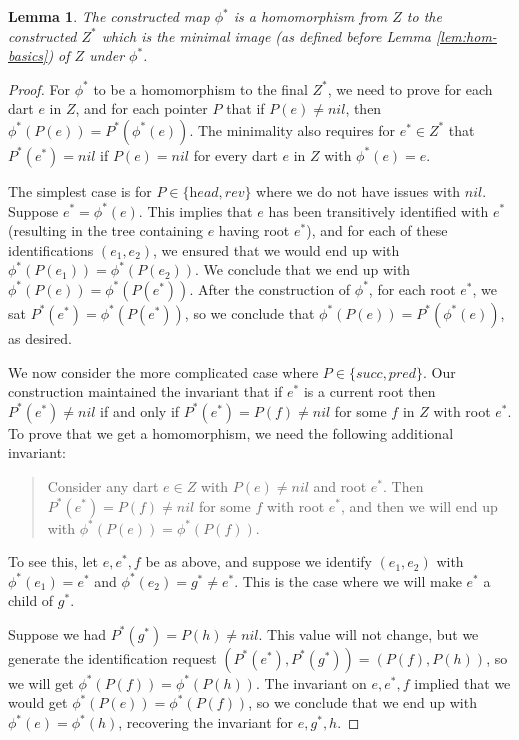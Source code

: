\documentclass[10pt,a4paper]{article}
\newtheorem{lem}[thm]{Lemma}
\def\nil{\textit{nil}}
\def\head{\textit{head}}
\def\reverse{\textit{rev}}
\def\successor{\textit{succ}}
\def\predecessor{\textit{pred}}
\begin{document}
\begin{lem}\label{lem:Z*}
The constructed map $\phi^*$ is a homomorphism from $Z$ to the constructed $Z^*$
which is the minimal image 
(as defined before Lemma  \ref{lem:hom-basics})
of $Z$ under $\phi^*$.
\end{lem}

\begin{proof}
    For $\phi^*$ to be a homomorphism to
    the final $Z^*$, we need to prove for each dart $e$ in $Z$, and for each
    pointer $P$ that if $P(e)\neq\nil$, then $\phi^*(P(e))=P^*(\phi^*(e))$. The minimality also requires for  $e^*\in Z^*$ that $P^*(e^*)=\nil$ if 
    $P(e)=\nil$ for every dart $e$ in $Z$ with $\phi^*(e)=e$.

    The simplest case is for $P\in\{\head,\reverse\}$ where we do not have issues with $\nil$. Suppose $e^*=\phi^*(e)$.
    This implies that $e$ has been transitively identified with $e^*$ (resulting in the tree containing $e$ having root $e^*$), and for each of these identifications $(e_1,e_2)$, we ensured that
    we would end up with $\phi^*(P(e_1))=\phi^*(P(e_2))$. We conclude that we end up with $\phi^*(P(e))=\phi^*(P(e^*))$. After the construction of $\phi^*$, 
    for each root $e^*$, we sat 
    $P^*(e^*)=\phi^*(P(e^*))$, so we
    conclude that 
    $\phi^*(P(e))=P^*(\phi^*(e))$, as desired.

    We now consider the more complicated case where 
    $P\in\{\successor,\predecessor\}$. 
    Our construction maintained the invariant that     if $e^*$ is a current root then $P^*(e^*)\neq\nil$ if and only if $P^*(e^*)=P(f)\neq\nil$
    for some $f$ in $Z$
    with root $e^*$. To prove that we get a homomorphism, we need the following additional invariant:
    \begin{quote}
        Consider any dart $e\in Z$ with $P(e)\neq \nil$ and root $e^*$.
       Then $P^*(e^*)=P(f)\neq\nil$ for
    some $f$ with root $e^*$, and then we will end up with $\phi^*(P(e))=\phi^*(P(f))$.
    \end{quote}
    To see this, let $e,e^*,f$ be as above, and suppose we  identify $(e_1,e_2)$ with $\phi^*(e_1)=e^*$ and $\phi^*(e_2)=g^*\neq e^*$. 
    This is the case where we will make $e^*$ a child of $g^*$.

    Suppose we had $P^*(g^*)=P(h)\neq\nil$. This value will not change, but we generate the identification request $(P^*(e^*),P^*(g^*))=
    (P(f),P(h))$, so we will get $\phi^*(P(f))=\phi^*(P(h))$. The invariant on $e,e^*,f$ implied that we would get $\phi^*(P(e))=\phi^*(P(f))$, so we conclude that we end up with $\phi^*(e)=\phi^*(h)$, recovering the invariant for $e,g^*,h$.


\end{proof}
\end{document}
